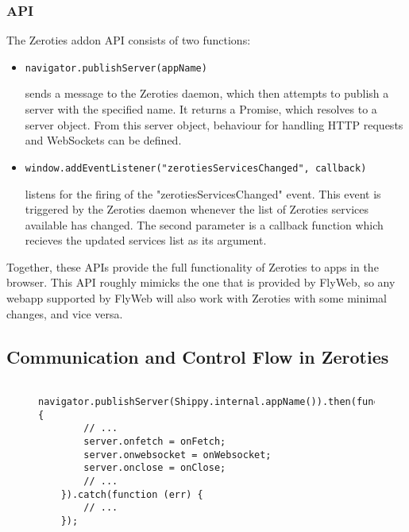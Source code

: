 \subsubsection{API}
The Zeroties addon API consists of two functions:
\begin{itemize}
\item \begin{verbatim}navigator.publishServer(appName)\end{verbatim} sends a message to the Zeroties daemon, which then attempts to publish a server with the specified name.
It returns a Promise, which resolves to a server object. From this server object, behaviour for handling HTTP requests and WebSockets can be defined.
\item \begin{verbatim}window.addEventListener("zerotiesServicesChanged", callback)\end{verbatim} listens for the firing of the "zerotiesServicesChanged" event. This event is triggered by the Zeroties daemon whenever the list of Zeroties services available has changed.
The second parameter is a callback function which recieves the updated services list as its argument.
\end{itemize}

Together, these APIs provide the full functionality of Zeroties to apps in the browser. 
This API roughly mimicks the one that is provided by FlyWeb, so any webapp supported by FlyWeb will also work with Zeroties with some minimal changes, and vice versa.




\subsection{Communication and Control Flow in Zeroties}
\label{sub:communication}
\begin{figure}[h]
    \centering
\begin{lstlisting}
    navigator.publishServer(Shippy.internal.appName()).then(function(server) {
        // ...
        server.onfetch = onFetch;
        server.onwebsocket = onWebsocket;
        server.onclose = onClose;
        // ...
    }).catch(function (err) {
        // ...
    });
\end{lstlisting}
    \caption{}
    \label{fig:publishServer}
\end{figure}

